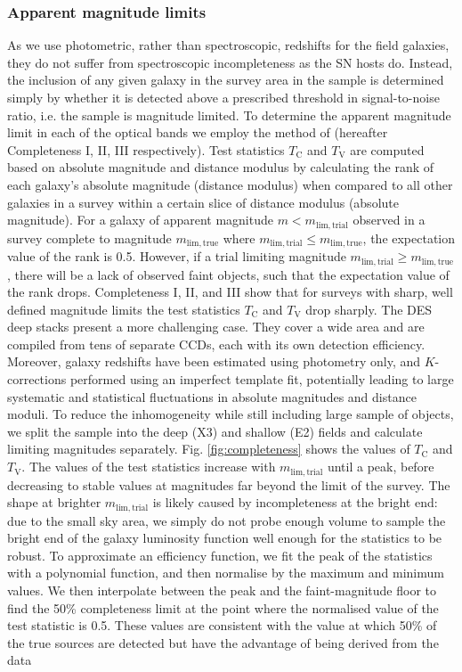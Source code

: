 \documentclass[fleqn,usenatbib]{mnras}
\begin{document}
\subsubsection{Apparent magnitude limits \label{subsubsec:mag_lims}}
As we use photometric, rather than spectroscopic, redshifts for the field galaxies, they do not suffer from spectroscopic incompleteness as the SN hosts do. Instead, the inclusion of any given galaxy in the survey area in the sample is determined simply by whether it is detected above a prescribed threshold in signal-to-noise ratio, i.e. the sample is magnitude limited. To determine the apparent magnitude limit in each of the optical bands we employ the method of \citet{Johnston2007,Teodoro2010,Johnston2012} (hereafter Completeness I, II, III respectively). Test statistics $T_{\mathrm{C}}$ and $T_{\mathrm{V}}$ are computed based on absolute magnitude and distance modulus by calculating the rank of each galaxy's absolute magnitude (distance modulus) when compared to all other galaxies in a survey within a certain slice of distance modulus (absolute magnitude). For a galaxy of apparent magnitude $m < m_{\mathrm{lim, trial}}$ observed in a survey complete to magnitude $m_{\mathrm{lim, true}}$ where  $m_{\mathrm{lim, trial}} \leq m_{\mathrm{lim, true}}$, the expectation value of the rank is 0.5. However, if a trial limiting magnitude $m_{\mathrm{lim, trial}} \geq m_{\mathrm{lim, true}}$, there will be a lack of observed faint objects, such that the expectation value of the rank drops. Completeness I, II, and III show that for surveys with sharp, well defined magnitude limits the test statistics $T_{\mathrm{C}}$ and $T_{\mathrm{V}}$ drop sharply. The DES deep stacks present a more challenging case. They cover a wide area and are compiled from tens of separate CCDs, each with its own detection efficiency. Moreover, galaxy redshifts have been estimated using photometry only, and $K$-corrections performed using an imperfect template fit, potentially leading to large systematic and statistical fluctuations in absolute magnitudes and distance moduli. To reduce the inhomogeneity while still including  large sample of objects, we split the sample into the deep (X3) and shallow (E2) fields and calculate limiting magnitudes separately. Fig. \ref{fig:completeness} shows the values of $T_{\mathrm{C}}$ and $T_{\mathrm{V}}$. The values of the test statistics increase with $m_{\mathrm{lim, trial}}$ until a peak, before decreasing to stable values at magnitudes far beyond the limit of the survey. The shape at brighter $m_{\mathrm{lim, trial}}$ is likely caused by incompleteness at the bright end: due to the small sky area, we simply do not probe enough volume to sample the bright end of the galaxy luminosity function well enough for the statistics to be robust. To approximate an efficiency function, we fit the peak of the statistics with a polynomial function, and then normalise by the maximum and minimum values. We then interpolate between the peak and the faint-magnitude floor to find the 50\% completeness limit at the point where the normalised value of the test statistic is 0.5. These values are consistent with the value at which 50\% of the true sources are detected but have the advantage of being derived from the data 
\end{document}
